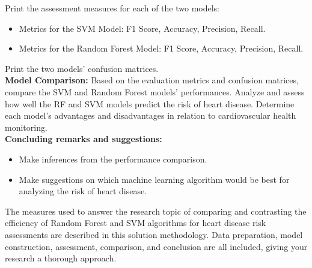 Print the assessment measures for each of the two models:
\begin{itemize}
    \item Metrics for the SVM Model: F1 Score, Accuracy, Precision, Recall.
    \item Metrics for the Random Forest Model: F1 Score, Accuracy, Precision, Recall.
\end{itemize}

Print the two models' confusion matrices.
\\
\textbf{Model Comparison:} Based on the evaluation metrics and confusion matrices, compare the SVM and Random Forest models' performances. Analyze and assess how well the RF and SVM models predict the risk of heart disease. Determine each model's advantages and disadvantages in relation to cardiovascular health monitoring.
\\
\textbf{Concluding remarks and suggestions:}
\begin{itemize}
    \item Make inferences from the performance comparison.
    \item Make suggestions on which machine learning algorithm would be best for analyzing the risk of heart disease.
\end{itemize}

The measures used to answer the research topic of comparing and contrasting the efficiency of Random Forest and SVM algorithms for heart disease risk assessments are described in this solution methodology. Data preparation, model construction, assessment, comparison, and conclusion are all included, giving your research a thorough approach.






